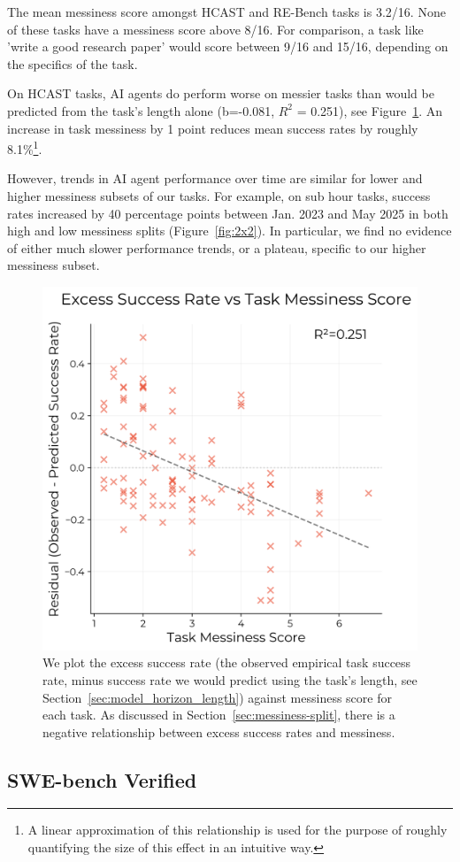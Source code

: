 \documentclass{article}
\newcommand{\gabenchmark}{HCAST}
\begin{document}
The mean messiness score amongst \gabenchmark{} and RE-Bench tasks is 3.2/16. None of these tasks have a messiness score above 8/16. For comparison, a task like 'write a good research paper' would score between 9/16 and 15/16, depending on the specifics of the task.

On \gabenchmark{} tasks, AI agents do perform worse on messier tasks than would be predicted from the task's length alone (b=-0.081, $R^2$ = 0.251), see Figure~\ref{fig:observed-predicted-messiness}. An increase in task messiness by 1 point reduces mean success rates by roughly 8.1\%\footnote{A linear approximation of this relationship is used for the purpose of roughly quantifying the size of this effect in an intuitive way.}.

However, trends in AI agent performance over time are similar for lower and higher messiness subsets of our tasks. For example, on sub hour tasks, success rates increased by 40 percentage points between Jan. 2023 and May 2025 in both high and low messiness splits (Figure~\ref{fig:2x2}). In particular, we find no evidence of either much slower performance trends, or a plateau, specific to our higher messiness subset. 

\begin{figure}
    \centering
    \includegraphics[width=0.5\linewidth]{plots/messiness/messiness_effect_expanded_combined_alpha_0.010.png}
    \caption{We plot the excess success rate (the observed empirical task success rate, minus success rate we would predict using the task's length, see Section~\ref{sec:model_horizon_length}) against messiness score for each task. As discussed in Section~\ref{sec:messiness-split}, there is a negative relationship between excess success rates and messiness.}
    \label{fig:observed-predicted-messiness}
\end{figure}

\subsection{SWE-bench Verified} \label{sec:swebench}
\end{document}
